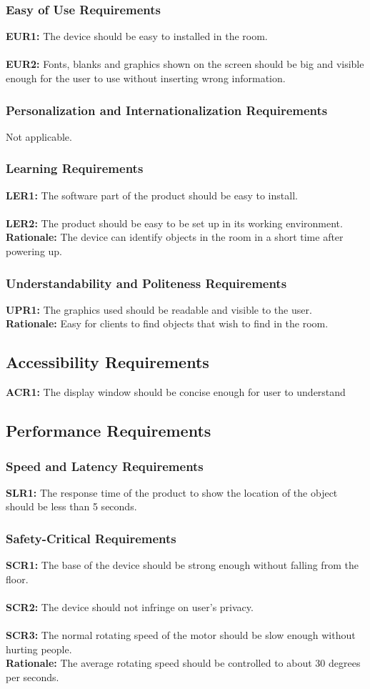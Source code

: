 \documentclass[12pt]{article}
\begin{document}
\subsubsection{Easy of Use Requirements}
\textbf{EUR1:} The device should be easy to installed in the room.\\\\
\textbf{EUR2:} Fonts, blanks and graphics shown on the screen should be big and visible enough for the user to use without inserting wrong information.
\subsubsection{Personalization and Internationalization Requirements}
Not applicable.
\subsubsection{Learning Requirements}
\textbf{LER1:} The software part of the product should be easy to install.\\\\
\textbf{LER2:} The product should be easy to be set up in its working environment.\\
\textbf{Rationale:} The device can identify objects in the room in a short time after powering up.
\subsubsection{Understandability and Politeness Requirements}
\textbf{UPR1:} The graphics used should be readable and visible to the user.\\
\textbf{Rationale:} Easy for clients to find objects that wish to find in the room.
\subsection{Accessibility Requirements}
\textbf{ACR1:} The display window should be concise enough for user to understand
\subsection{Performance Requirements}
\subsubsection{Speed and Latency Requirements}
\textbf{SLR1:} The response time of the product to show the location of the object should be less than 5 seconds.
\subsubsection{Safety-Critical Requirements}
\textbf{SCR1:} The base of the device should be strong enough without falling from the floor.\\\\
\textbf{SCR2:} The device should not infringe on user's privacy.\\\\
\textbf{SCR3:} The normal rotating speed of the motor should be slow enough without hurting people.\\
\textbf{Rationale:} The average rotating speed should be controlled to about 30 degrees per seconds.
\end{document}
